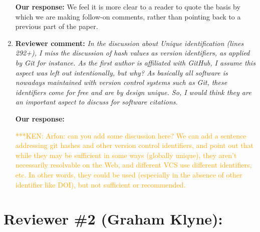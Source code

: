 \documentclass{article}
\newcommand{\niemnote}[1]{ {\textcolor{orange} { ***KEN: #1 }}} %
\begin{document}
\begin{enumerate}
\textbf{Our response:}
We feel it is more clear to a reader to quote the basis by which we are making follow-on comments, rather than pointing back to a previous part of the paper.


\item \textbf{Reviewer comment:}
\emph{In the discussion about Unique identification (lines 292+), I miss the discussion of hash values as version identifiers, as applied by Git for instance. As the first author is affiliated with GitHub, I assume this aspect was left out intentionally, but why? As basically all software is nowadays maintained with version control systems such as Git, these identifiers come for free and are by design unique. So, I would think they are an important aspect to discuss for software citations.}

\textbf{Our response:}

\niemnote{Arfon: can you add some discussion here? We can add a sentence addressing git hashes and other version control identifiers, and point out that while they may be sufficient in some ways (globally unique), they aren't necessarily resolvable on the Web, and different VCS use different identifiers, etc. In other words, they could be used (especially in the absence of other identifier like DOI), but not sufficient or recommended.}

\end{enumerate}

\section*{Reviewer \#2 (Graham Klyne):}
\end{document}
